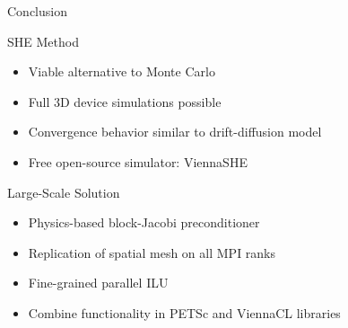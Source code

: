 \documentclass[usepdftitle=false,10pt]{beamer}
\begin{document}
\begin{frame}{Conclusion}

  \begin{block}{SHE Method}
   \begin{itemize}
    \item Viable alternative to Monte Carlo
    \item Full 3D device simulations possible
    \item Convergence behavior similar to drift-diffusion model
    \item Free open-source simulator: ViennaSHE
   \end{itemize}
  \end{block}
  
  
  \begin{block}{Large-Scale Solution}
   \begin{itemize}
    \item Physics-based block-Jacobi preconditioner
    \item Replication of spatial mesh on all MPI ranks
    \item Fine-grained parallel ILU
    \item Combine functionality in PETSc and ViennaCL libraries
   \end{itemize}
  \end{block}
  
\end{frame}
\end{document}
